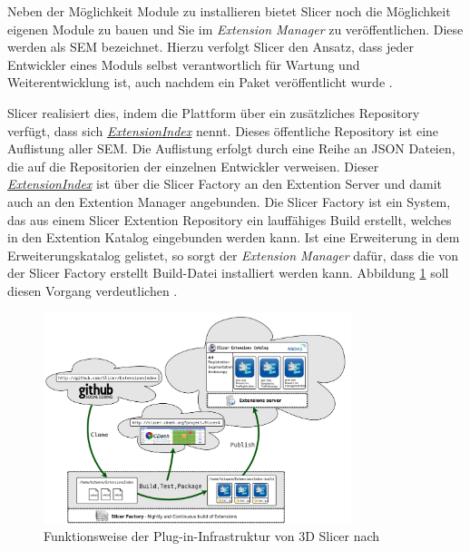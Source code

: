 Neben der Möglichkeit Module zu installieren bietet Slicer noch die Möglichkeit eigenen
Module zu bauen und Sie im \textit{Extension Manager} zu veröffentlichen. Diese werden
als \ac{SEM} bezeichnet. Hierzu verfolgt Slicer den Ansatz, dass jeder
Entwickler eines Moduls selbst verantwortlich für Wartung und Weiterentwicklung
ist, auch nachdem ein Paket veröffentlicht wurde \citep[vgl.][]{slicer2024}.

Slicer realisiert dies, indem die Plattform über ein zusätzliches Repository verfügt,
dass sich
\href{https://github.com/Slicer/ExtensionsIndex?tab=readme-ov-file}{\textit{ExtensionIndex}}
nennt. Dieses öffentliche Repository ist eine Auflistung aller \ac{SEM}. Die Auflistung
erfolgt durch eine Reihe an \ac{JSON} Dateien, die auf die Repositorien der einzelnen
Entwickler verweisen. Dieser
\href{https://github.com/Slicer/ExtensionsIndex?tab=readme-ov-file}{\textit{ExtensionIndex}}
ist über die Slicer Factory an den Extention Server und damit auch an den
Extention Manager angebunden. Die Slicer Factory ist ein System, das aus einem
Slicer Extention Repository ein lauffähiges Build erstellt, welches in den Extention
Katalog eingebunden werden kann. Ist eine Erweiterung in dem Erweiterungskatalog
gelistet, so sorgt der \textit{Extension Manager} dafür, dass die von der Slicer
Factory erstellt Build-Datei installiert werden kann. Abbildung
\ref{fig:3d_slicer_extension_index} soll diesen Vorgang verdeutlichen \citep[vgl.][]{slicer2024}.

\begin{figure}[h]
	\centering
	\includegraphics[width=0.8\textwidth]{img/slicer_extention_index.png}
	\caption{Funktionsweise der Plug-in-Infrastruktur von 3D Slicer nach \citet{extensionsIndex2024}}
	\label{fig:3d_slicer_extension_index}
\end{figure}

